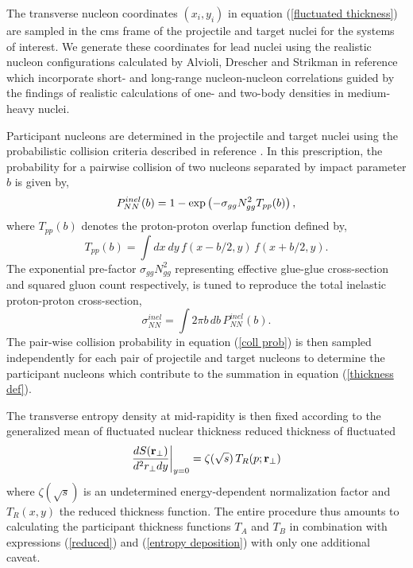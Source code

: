 \documentclass[aps,prl,reprint,amsmath,nofootinbib]{revtex4-1}
\begin{document}
The transverse nucleon coordinates $(x_i,y_i)$ in equation (\ref{fluctuated thickness}) are sampled in the cms frame of the projectile and target nuclei for the systems of interest. We generate
these coordinates for lead nuclei using the realistic nucleon configurations calculated by Alvioli, Drescher and Strikman in reference \cite{nucleon-correlations} which incorporate short- 
and long-range nucleon-nucleon correlations guided by the findings of realistic calculations of one- and two-body densities in medium-heavy nuclei.

Participant nucleons are determined in the projectile and target nuclei using the probabilistic collision criteria described in reference \cite{proton-proton}. In this prescription, the 
probability for a pairwise collision of two nucleons separated by impact parameter $b$ is given by,
\begin{equation}
  \label{coll prob}
  P^{inel}_{NN}(b) = 1 - \exp \left(-\sigma_{gg} N_{gg}^2 T_{pp}(b) \right), \\[1ex]
\end{equation}
where $T_{pp}(b)$ denotes the proton-proton overlap function defined by,
\begin{equation}
 T_{pp}(b) = \int dx~dy \,f(x-b/2,y) \,f(x+b/2,y).
\end{equation}
The exponential pre-factor $\sigma_{gg} N_{gg}^2$ representing effective glue-glue cross-section and squared gluon count respectively, is tuned to reproduce the total 
inelastic proton-proton cross-section,
\begin{equation}
  \sigma^{inel}_{NN} = \int 2 \pi b \,db \, P_{NN}^{inel}(b).
\end{equation}
The pair-wise collision probability in equation (\ref{coll prob}) is then sampled independently for each pair of projectile and target nucleons to determine the participant nucleons 
which contribute to the summation in equation (\ref{thickness def}).

The transverse entropy density at mid-rapidity is then fixed according to the generalized mean of fluctuated nuclear thickness reduced thickness of fluctuated 
\begin{equation}
 \label{entropy deposition}
 \frac{dS({\bf r}_\perp)}{d^2r_\perp dy} \biggr \rvert_{y=0} = \zeta(\sqrt{s})\, T_R(p;{\bf r}_\perp)
\end{equation}
where $\zeta(\sqrt{s})$ is an undetermined energy-dependent normalization factor and $T_R(x,y)$ the reduced thickness function. The entire procedure thus amounts to calculating the participant 
thickness functions $T_A$ and $T_B$ in combination with expressions (\ref{reduced}) and (\ref{entropy deposition}) with only one additional caveat.
\end{document}
